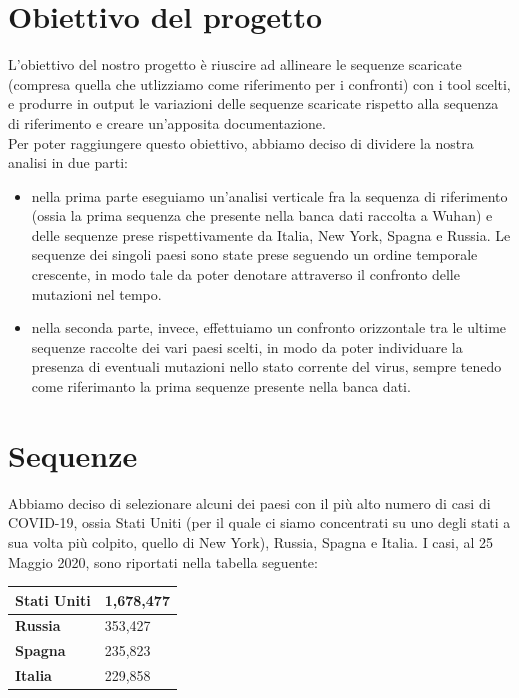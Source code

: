 \documentclass[a4paper,10pt]{article}
\begin{document}
\newpage

\section{Obiettivo del progetto}
L'obiettivo del nostro progetto è riuscire ad allineare le sequenze scaricate (compresa quella che utlizziamo come riferimento per i confronti) con i tool scelti, e produrre in output le variazioni delle sequenze scaricate rispetto alla sequenza di riferimento e creare un'apposita documentazione. \\
Per poter raggiungere questo obiettivo, abbiamo deciso di dividere la nostra analisi in due parti:\\ 
\begin{itemize}
\item nella prima parte eseguiamo un'analisi verticale fra la sequenza di riferimento (ossia la prima sequenza che presente nella banca dati raccolta a Wuhan) e delle sequenze prese rispettivamente da Italia, New York, Spagna e Russia. Le sequenze dei singoli paesi sono state prese seguendo un ordine temporale crescente, in modo tale da poter denotare attraverso il confronto delle mutazioni nel tempo.
\item nella seconda parte, invece, effettuiamo un confronto orizzontale tra le ultime sequenze raccolte dei vari paesi scelti, in modo da poter individuare la presenza di eventuali mutazioni nello stato corrente del virus, sempre tenedo come riferimanto la prima sequenze presente nella banca dati. 
\end{itemize}

\section{Sequenze}
Abbiamo deciso di selezionare alcuni dei paesi con il più alto numero di casi di COVID-19, ossia Stati Uniti (per il quale ci siamo concentrati su uno degli stati a sua volta più colpito, quello di New York), Russia,  Spagna e Italia. I casi, al 25 Maggio 2020, sono riportati nella tabella seguente:

\begin{table}[H]
\centering
\begin{tabular}{|l|l|}
\hline
\textbf{Stati Uniti} & 1,678,477 \\ \hline
\textbf{Russia}      & 353,427   \\ \hline
\textbf{Spagna}      & 235,823   \\ \hline
\textbf{Italia}      & 229,858   \\ \hline
\end{tabular}
\end{table}
\end{document}
